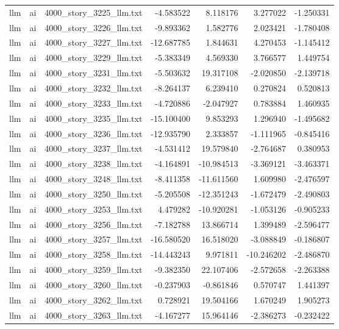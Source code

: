 \begin{longtable}{lllrrrr}
llm & ai & 4000\_story\_3225\_llm.txt & -4.583522 & 8.118176 & 3.277022 & -1.250331 \\
llm & ai & 4000\_story\_3226\_llm.txt & -9.893362 & 1.582776 & 2.023421 & -1.780408 \\
llm & ai & 4000\_story\_3227\_llm.txt & -12.687785 & 1.844631 & 4.270453 & -1.145412 \\
llm & ai & 4000\_story\_3229\_llm.txt & -5.383349 & 4.569330 & 3.766577 & 1.449754 \\
llm & ai & 4000\_story\_3231\_llm.txt & -5.503632 & 19.317108 & -2.020850 & -2.139718 \\
llm & ai & 4000\_story\_3232\_llm.txt & -8.264137 & 6.239410 & 0.270824 & 0.520813 \\
llm & ai & 4000\_story\_3233\_llm.txt & -4.720886 & -2.047927 & 0.783884 & 1.460935 \\
llm & ai & 4000\_story\_3235\_llm.txt & -15.100400 & 9.853293 & 1.296940 & -1.495682 \\
llm & ai & 4000\_story\_3236\_llm.txt & -12.935790 & 2.333857 & -1.111965 & -0.845416 \\
llm & ai & 4000\_story\_3237\_llm.txt & -4.531412 & 19.579840 & -2.764687 & 0.380953 \\
llm & ai & 4000\_story\_3238\_llm.txt & -4.164891 & -10.984513 & -3.369121 & -3.463371 \\
llm & ai & 4000\_story\_3248\_llm.txt & -8.411358 & -11.611560 & 1.609980 & -2.476597 \\
llm & ai & 4000\_story\_3250\_llm.txt & -5.205508 & -12.351243 & -1.672479 & -2.490803 \\
llm & ai & 4000\_story\_3253\_llm.txt & 4.479282 & -10.920281 & -1.053126 & -0.905233 \\
llm & ai & 4000\_story\_3256\_llm.txt & -7.182788 & 13.866714 & 1.399489 & -2.596477 \\
llm & ai & 4000\_story\_3257\_llm.txt & -16.580520 & 16.518020 & -3.088849 & -0.186807 \\
llm & ai & 4000\_story\_3258\_llm.txt & -14.443243 & 9.971811 & -10.246202 & -2.486870 \\
llm & ai & 4000\_story\_3259\_llm.txt & -9.382350 & 22.107406 & -2.572658 & -2.263388 \\
llm & ai & 4000\_story\_3260\_llm.txt & -0.237903 & -0.861846 & 0.570747 & 1.441397 \\
llm & ai & 4000\_story\_3262\_llm.txt & 0.728921 & 19.504166 & 1.670249 & 1.905273 \\
llm & ai & 4000\_story\_3263\_llm.txt & -4.167277 & 15.964146 & -2.386273 & -0.232422 \\

\end{longtable}
